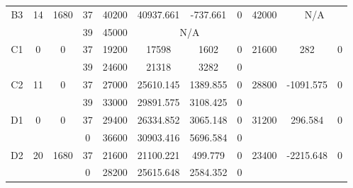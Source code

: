 \begin{sidewaystable}
\begin{tabular}{c||c|c||c|c|c|c|c||c|c|c}
         &
        
      \\
      \hline
      \multirow{2}{*}{B3} &
      \multirow{2}{*}{14} &
      \multirow{2}{*}{1680} &
      37 &
      40200 &
        40937.661 &
        -737.661 &
        0 &
      \multirow{2}{*}{42000} &
        \multicolumn{2}{c}{\multirow{2}{*}{N/A}}
      \\
      \cline{4-8}
       &
       &
       &
      39 &
      45000 &
        \multicolumn{3}{|c||}{N/A} &
      
        
      \\
      \hline
      \multirow{2}{*}{C1} &
      \multirow{2}{*}{0} &
      \multirow{2}{*}{0} &
      37 &
      19200 &
        17598 &
        1602 &
        0 &
      \multirow{2}{*}{21600} &
        \multirow{2}{*}{282} &
        \multirow{2}{*}{0}
      \\
      \cline{4-8}
       &
       &
       &
      39 &
      24600 &
        21318 &
        3282 &
        0 &
      
         &
        
      \\
      \hline
      \multirow{2}{*}{C2} &
      \multirow{2}{*}{11} &
      \multirow{2}{*}{0} &
      37 &
      27000 &
        25610.145 &
        1389.855 &
        0 &
      \multirow{2}{*}{28800} &
        \multirow{2}{*}{-1091.575} &
        \multirow{2}{*}{0}
      \\
      \cline{4-8}
       &
       &
       &
      39 &
      33000 &
        29891.575 &
        3108.425 &
        0 &
      
         &
        
      \\
      \hline
      \multirow{2}{*}{D1} &
      \multirow{2}{*}{0} &
      \multirow{2}{*}{0} &
      37 &
      29400 &
        26334.852 &
        3065.148 &
        0 &
      \multirow{2}{*}{31200} &
        \multirow{2}{*}{296.584} &
        \multirow{2}{*}{0}
      \\
      \cline{4-8}
       &
       &
       &
      0 &
      36600 &
        30903.416 &
        5696.584 &
        0 &
      
         &
        
      \\
      \hline
      \multirow{2}{*}{D2} &
      \multirow{2}{*}{20} &
      \multirow{2}{*}{1680} &
      37 &
      21600 &
        21100.221 &
        499.779 &
        0 &
      \multirow{2}{*}{23400} &
        \multirow{2}{*}{-2215.648} &
        \multirow{2}{*}{0}
      \\
      \cline{4-8}
       &
       &
       &
      0 &
      28200 &
        25615.648 &
        2584.352 &
        0 &
      

\end{tabular}
\end{sidewaystable}
